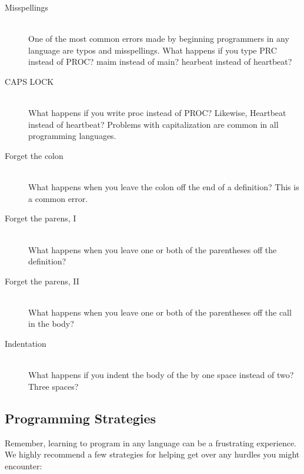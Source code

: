 \begin{description}
  \item[Misspellings]\ \\ One of the most common errors made by beginning programmers in any language are typos and misspellings. What happens if you type {\code PRC} instead of {\code PROC}? {\code maim} instead of {\code main}? {\code hearbeat} instead of {\code heartbeat}?

	\item[CAPS LOCK]\ \\ What happens if you write {\code proc} instead of {\code PROC}? Likewise, {\code Heartbeat} instead of {\code heartbeat}? Problems with capitalization are common in all programming languages.

	\item[Forget the colon]\ \\ What happens when you leave the colon off the end of a \PROC definition? This is a  common error.
	
	\item[Forget the parens, I]\ \\ What happens when you leave one or both of the parentheses off the \PROC definition?
	
	\item[Forget the parens, II]\ \\ What happens when you leave one or both of the parentheses off the \PROC call in the body?
	
	\item[Indentation]\ \\ What happens if you indent the body of the \PROC by one space instead of two? Three spaces? 
\end{description}

\subsection{Programming Strategies}
Remember, learning to program in any language can be a frustrating experience. We highly recommend a few strategies for helping get over any hurdles you might encounter:

